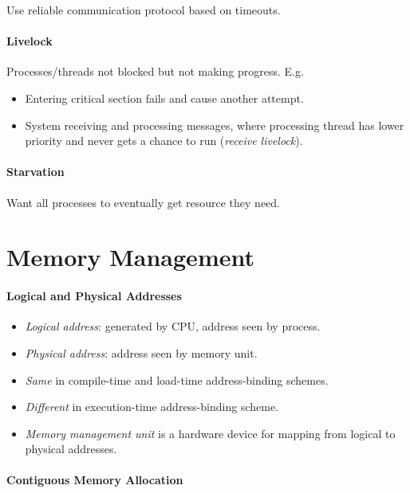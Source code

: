 \documentclass[twocolumn,english]{article}
\begin{document}
Use reliable communication protocol based on timeouts.

\paragraph{Livelock}

Processes/threads not blocked but not making progress. E.g.
\begin{itemize}
\item Entering critical section fails and cause another attempt.
\item System receiving and processing messages, where processing thread
has lower priority and never gets a chance to run (\emph{receive livelock}).
\end{itemize}

\paragraph{Starvation}

Want all processes to eventually get resource they need.

\section{Memory Management}

\paragraph{Logical and Physical Addresses}
\begin{itemize}
\item \emph{Logical address}: generated by CPU, address seen by process.
\item \emph{Physical address}: address seen by memory unit.
\item \emph{Same} in compile-time and load-time address-binding schemes.
\item \emph{Different} in execution-time address-binding scheme.
\item \emph{Memory management unit} is a hardware device for mapping from
logical to physical addresses.
\end{itemize}

\paragraph{Contiguous Memory Allocation}
\end{document}
